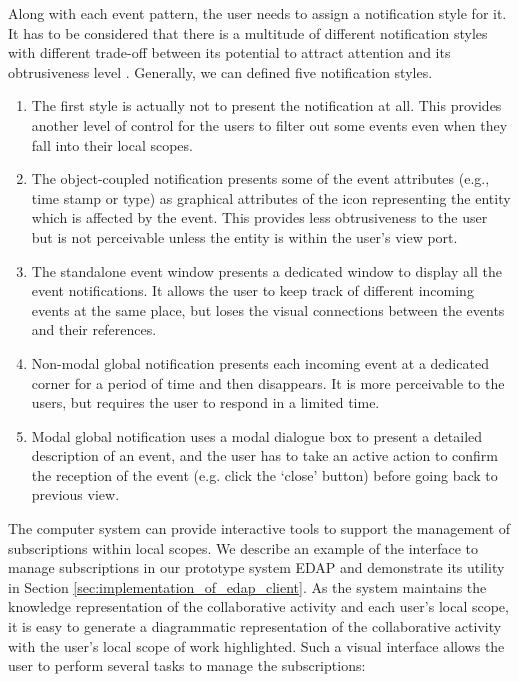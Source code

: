 Along with each event pattern, the user needs to assign a notification style for it. It has to be considered that there is a multitude of different notification styles with different trade-off between its potential to attract attention and its obtrusiveness level \cite{Rauschenbach1996}. Generally, we can defined five notification styles. 
\begin{enumerate}
	\item The first style is actually not to present the notification at all. This provides another level of control for the users to filter out some events even when they fall into their local scopes.
	\item The object-coupled notification presents some of the event attributes (e.g., time stamp or type) as graphical attributes of the icon representing the entity which is affected by the event. This provides less obtrusiveness to the user but is not perceivable unless the entity is within the user's view port.
	\item The standalone event window presents a dedicated window to display all the event notifications. It allows the user to keep track of different incoming events at the same place, but loses the visual connections between the events and their references.
	\item Non-modal global notification presents each incoming event at a dedicated corner for a period of time and then disappears. It is more perceivable to the users, but requires the user to respond in a limited time.
	\item Modal global notification uses a modal dialogue box to present a detailed description of an event, and the user has to take an active action to confirm the reception of the event (e.g. click the `close' button) before going back to previous view. 
\end{enumerate}

The computer system can provide interactive tools to support the management of subscriptions within local scopes. We describe an example of the interface to manage subscriptions in our prototype system EDAP and demonstrate its utility in Section \ref{sec:implementation_of_edap_client}. As the system maintains the knowledge representation of the collaborative activity and each user's local scope, it is easy to generate a diagrammatic representation of the collaborative activity with the user's local scope of work highlighted. Such a visual interface allows the user to perform several tasks to manage the subscriptions:

